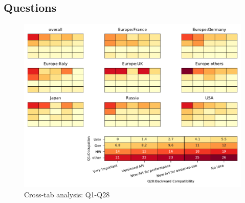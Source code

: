 
\subsection{Questions}


\begin{figure}
\begin{center}
\includegraphics[width=12cm]{../pdfs/Q1-Q28.pdf}
\caption{Cross-tab analysis: Q1-Q28}
\label{fig:Q1-Q28}
\end{center}
\end{figure}
